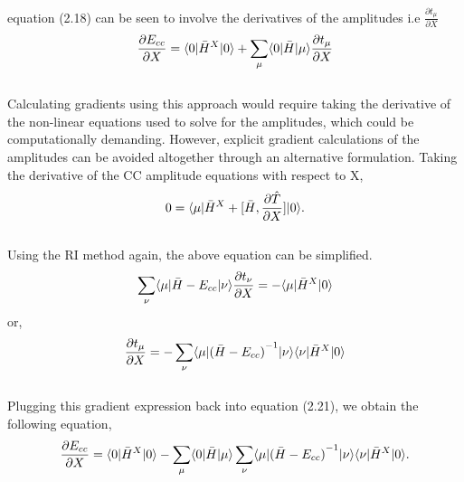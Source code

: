 \\
equation (2.18) can be seen to involve the derivatives of the amplitudes i.e $\frac{\partial{t_\mu}}{\partial X}$
\\
\begin{equation}
\frac{\partial{E_{cc}}}{\partial X} = \langle 0 |{\bar{H}}^X| 0 \rangle + \sum_{\mu}\langle 0 |\bar{H}| \mu \rangle \frac{\partial{t_{\mu}}}{\partial X}
\end{equation}
\\
Calculating gradients using this approach would require taking the derivative of the non-linear equations
used to solve for the amplitudes, which could be computationally demanding. However, explicit gradient 
calculations of the amplitudes can be avoided altogether through an alternative formulation.
Taking the derivative of the CC amplitude equations with respect to X, 
\\
\begin{equation} 
0 = \langle \mu |{\bar{H}}^X + \lbrack\bar H , \frac{\partial{\hat T}}{\partial
X}\rbrack| 0 \rangle.
\end{equation} 
\\
Using the RI method again, the above equation can be simplified.
\\
\begin{equation}
\sum_{\nu}\langle \mu |\bar{H}-E_{cc}| \nu \rangle \frac{\partial{t_\nu}}{\partial X}
= - \langle \mu |{\bar{H}}^X| 0 \rangle
\end{equation}
or,
\begin{equation} 
\frac{\partial{t_\mu}}{\partial X} = -\sum_{\nu}
\langle \mu |{(\bar{H}-E_{cc})}^{-1}| \nu \rangle\langle \nu |{\bar{H}}^X| 0 \rangle
\end{equation}
\\
Plugging this gradient expression back into equation (2.21), we obtain the following equation,
\\
\begin{equation}
\frac{\partial{E_{cc}}}{\partial X} = \langle 0 |{\bar{H}}^X| 0 \rangle -
\sum_{\mu}\langle 0 |\bar{H}| \mu \rangle\sum_{\nu}
\langle \mu |{(\bar{H}-E_{cc})}^{-1}| \nu \rangle
\langle \nu |{\bar{H}}^X| 0 \rangle.
\end{equation}
